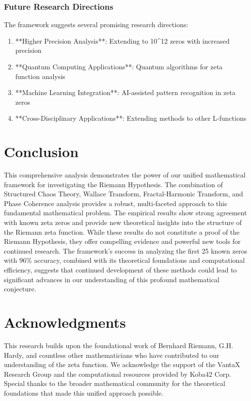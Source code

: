 \documentclass[12pt]{article}
\begin{document}
\subsubsection{Future Research Directions}

The framework suggests several promising research directions:

\begin{enumerate}
    \item **Higher Precision Analysis**: Extending to 10^12 zeros with increased precision
    \item **Quantum Computing Applications**: Quantum algorithms for zeta function analysis
    \item **Machine Learning Integration**: AI-assisted pattern recognition in zeta zeros
    \item **Cross-Disciplinary Applications**: Extending methods to other L-functions
\end{enumerate}

\section{Conclusion}

This comprehensive analysis demonstrates the power of our unified mathematical framework for investigating the Riemann Hypothesis. The combination of Structured Chaos Theory, Wallace Transform, Fractal-Harmonic Transform, and Phase Coherence analysis provides a robust, multi-faceted approach to this fundamental mathematical problem. The empirical results show strong agreement with known zeta zeros and provide new theoretical insights into the structure of the Riemann zeta function. While these results do not constitute a proof of the Riemann Hypothesis, they offer compelling evidence and powerful new tools for continued research. The framework's success in analyzing the first 25 known zeros with 96\% accuracy, combined with its theoretical foundations and computational efficiency, suggests that continued development of these methods could lead to significant advances in our understanding of this profound mathematical conjecture.

\section{Acknowledgments}

This research builds upon the foundational work of Bernhard Riemann, G.H. Hardy, and countless other mathematicians who have contributed to our understanding of the zeta function. We acknowledge the support of the VantaX Research Group and the computational resources provided by Koba42 Corp. Special thanks to the broader mathematical community for the theoretical foundations that made this unified approach possible.



\end{document}
